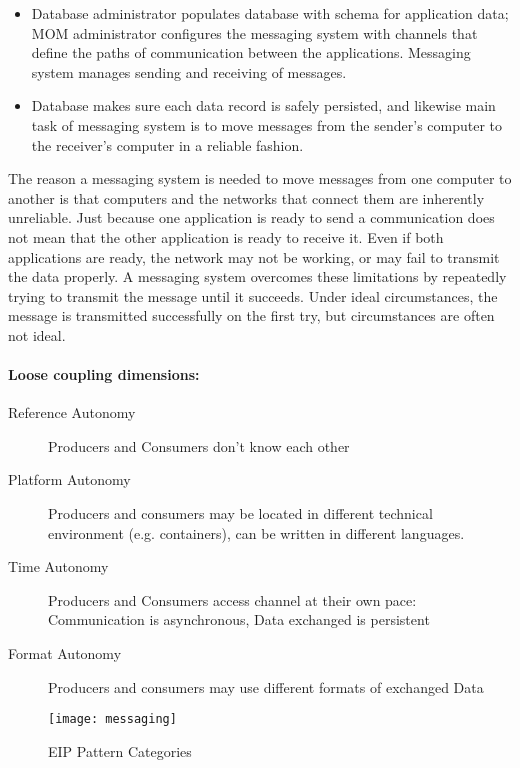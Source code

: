 \begin{itemize}
  \item Database administrator populates database with schema for application data; MOM administrator configures the messaging system with channels that define the paths of communication between the applications. Messaging system manages sending and receiving of messages.
  \item Database makes sure each data record is safely persisted, and likewise main task of messaging system is to move messages from the sender’s computer to the receiver’s computer in a reliable fashion.
\end{itemize}

The reason a messaging system is needed to move messages from one computer to another is that computers and the networks that connect them are inherently unreliable. Just because one application is ready to send a communication does not mean that the other application is ready to receive it. Even if both applications are ready, the network may not be working, or may fail to transmit the data properly. A messaging system overcomes these limitations by repeatedly trying to transmit the message until it succeeds. Under ideal circumstances, the message is transmitted successfully on the first try, but circumstances are often not ideal.

\paragraph{Loose coupling dimensions:}
\begin{description}
  \item [Reference Autonomy] Producers and Consumers don't know each other
  \item [Platform Autonomy] Producers and consumers may be located in different technical environment (e.g. containers), can be written in different languages.
  \item [Time Autonomy] Producers and Consumers access channel at their own pace: Communication is asynchronous, Data exchanged is persistent
  \item [Format Autonomy] Producers and consumers may use different formats of exchanged Data
\end{description}

\begin{figure}[H]
  \center
  \texttt{[image: messaging]}
  \caption{EIP Pattern Categories}
\end{figure}

